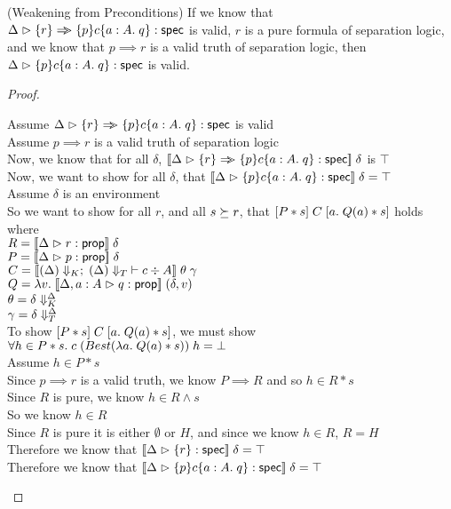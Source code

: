 \begin{lemma}{(Weakening from Preconditions)}
If we know that $\judgeS{\setof{r} \specimp \spec{p}{c}{a:A}{q}}$ is
valid, $r$ is a pure formula of separation logic, and we know that $p
\implies r$ is a valid truth of separation logic, then
$\judgeS{\spec{p}{c}{a:A}{q}}$ is valid.
\end{lemma}

\begin{proof}
  \begin{tabbedproof}
    \oo Assume $\judgeS{\setof{r} \specimp \spec{p}{c}{a:A}{q}}$ is valid \\
    \oo Assume $p \implies r$ is a valid truth of separation logic \\
    \ooo Now, we know that for all $\delta$, $\interp{\judgeS{\setof{r} \specimp \spec{p}{c}{a:A}{q}}}\;\delta$ is $\top$\\
    \ooo Now, we want to show for all $\delta$, that $\interp{\judgeS{\spec{p}{c}{a:A}{q}}}\;\delta = \top$ \\
    \ooo Assume $\delta$ is an environment \\
    \oooo So we want to show for all $r$, and all $s \worldgeq r$, that $\basicspec{P*s}{C}{a}{Q(a) * s}$ holds\\
    \ooox where \\
    \oooox $R = \interp{\judgeA{r}{\assert}}\;\delta$ \\
    \oooox $P = \interp{\judgeA{p}{\assert}}\;\delta$ \\
    \oooox $C = \interp{\judgeC[\restrictkind{\Delta}]{\restricttype{\Delta}}{c}{A}}\;\theta\;\gamma$ \\
    \oooox $Q = \semfun{v}{\interp{\judgeA[\Delta,a:A]{q}{\assert}}\;(\delta,v)}$ \\
    \oooox $\theta = \restricttyenv{\Delta}{\delta}$ \\
    \oooox $\gamma = \restrictvals{\Delta}{\delta}$ \\
    \oooo To show $\basicspec{P*s}{C}{a}{Q(a)*s}$, we must show 
          $\forall h \in P * s.\; c\; (Best(\semfun{a}{Q(a)*s}))\;h = \bot$ \\
    \oooo Assume $h \in P * s$ \\
    \ooooo Since $p \implies r$ is a valid truth, we know $P \implies R$ and so $h \in R * s$ \\
    \ooooo Since $R$ is pure, we know $h \in R \land s$ \\
    \ooooo So we know $h \in R$ \\
    \ooooo Since $R$ is pure it is either $\emptyset$ or $H$, and since we know $h \in R$, $R = H$ \\
    \ooooo Therefore we know that $\interp{\judgeS{\setof{r}}}\;\delta = \top$ \\
    \ooooo Therefore we know that $\interp{\judgeS{\spec{p}{c}{a:A}{q}}}\;\delta = \top$ \\
  \end{tabbedproof}
\end{proof}

